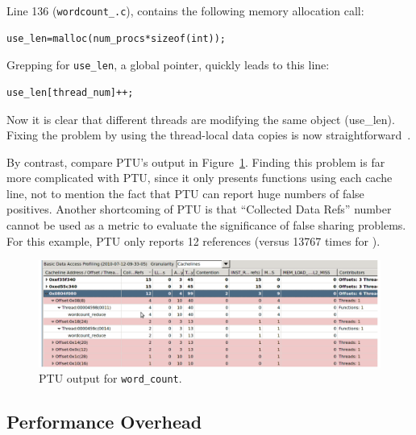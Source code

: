 Line 136 (\texttt{wordcount\_\pthreads{}.c}), 
contains the following memory allocation call:

\begin{verbatim}
use_len=malloc(num_procs*sizeof(int));
\end{verbatim}

Grepping for \texttt{use\_len}, a global pointer, quickly leads to this line:

\begin{verbatim}
use_len[thread_num]++;
\end{verbatim}

Now it is clear that different threads are modifying the same object
(use\_len). Fixing the problem by using the
thread-local data copies is now straightforward~\cite{detect:intel}.

By contrast, compare PTU's output in Figure~\ref{fig:wordcount}. Finding this problem is far more complicated with PTU, since it only presents functions using each cache line, not to mention the fact that PTU can
report huge numbers of false positives.  Another shortcoming
of PTU is that ``Collected Data Refs'' number cannot be used as a metric to evaluate the significance of false sharing problems. For this example, PTU only reports 12 references (versus 13767 times for \sheriffdetect{}).

\begin{figure}[!t]
\centering
\includegraphics[width=6in]{sheriff/figure/wordcount}
\caption{PTU output for \texttt{word\_count}.
\label{fig:wordcount}}
\end{figure}


\subsection{\sheriffdetect{} Performance Overhead}
\label{sec:results-runtime-overhead}

